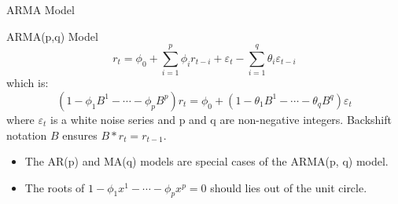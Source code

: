 \documentclass{beamer}
\begin{document}
\begin{frame}{ARMA Model}
  \begin{block}{ARMA(p,q) Model}
    \begin{displaymath}
      r_{t} =  \phi_{0}+\sum_{i=1}^{p} \phi_{i} r_{t-i}+\varepsilon_{t}-\sum_{i=1}^{q} \theta_{i} \varepsilon_{t-i}
    \end{displaymath}
    which is:
    \begin{displaymath}
    \left(1-\phi_{1} B^{1}-\cdots-\phi_{p} B^{p}\right) r_{t}=\phi_{0}+\left(1-\theta_{1} B^{1}-\cdots-\theta_{q} B^{q}\right) \varepsilon_{t}
    \end{displaymath}
    where ${\varepsilon_{t}}$ is a white noise series and p and q are non-negative integers. Backshift notation $B$ ensures $B*r_{t} = r_{t-1}$.
  \end{block}

  \begin{itemize}
    \item The AR(p) and MA(q) models are special cases of the ARMA(p, q) model. 
    \item The roots of $1-\phi_{1} x^{1}-\cdots-\phi_{p}x^{p}=0$ should lies out of the unit circle.
  \end{itemize}
\end{frame}
\end{document}
